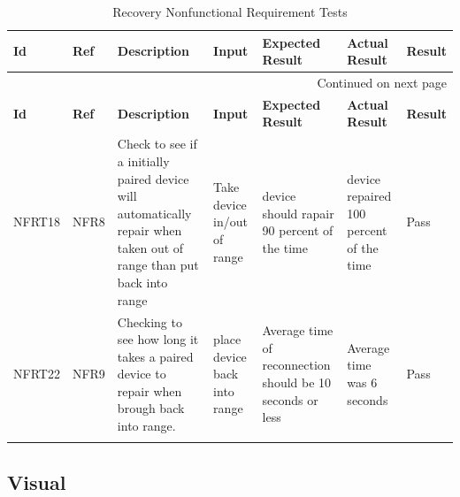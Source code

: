 \documentclass[12pt, titlepage]{article}
\begin{document}
\begin{longtable}{|p{1.4cm}|p{1.1cm}|p{2.5cm}|p{1.5cm}|p{2.2cm}|p{1.9cm}|p{1.2cm}|}

  \endfirsthead
  \hline
  \textbf{Id} & \textbf{Ref} & \textbf{Description}                                                         & \textbf{Input}                                    & \textbf{Expected Result}                                    & \textbf{Actual Result} & \textbf{Result}                                    \\ \hline

  \endhead

  \hline \multicolumn{7}{|r|}{Continued on next page} \\ \hline
  \endfoot
   
  \endlastfoot
  \hline
  \textbf{Id} & \textbf{Ref} & \textbf{Description}                                                         & \textbf{Input}                                    & \textbf{Expected Result}    & \textbf{Actual Result}                          & \textbf{Result}                                     \\ \hline
  NFRT18        & NFR8          & Check to see if a initially paired device will automatically repair when taken out of range than put back into range              & Take device in/out of range  & device should rapair 90 percent of the time   & device repaired 100 percent of the time    & {\color[HTML]{32CB00} Pass}                         \\ \hline
  NFRT22        & NFR9          & Checking to see how long it takes a paired device to repair when brough back into range.             & place device back into range    & Average time of reconnection should be 10 seconds or less          & Average time was 6 seconds       & {\color[HTML]{32CB00} Pass}                         \\ \hline
  \caption{Recovery Nonfunctional Requirement Tests}
  \label{RecoveryNonfunctionalRequirementTests}
\end{longtable}


\subsection{Visual}
\end{document}
